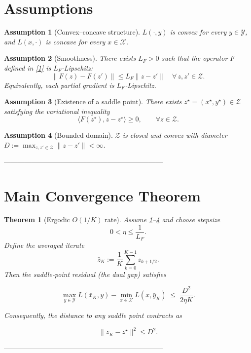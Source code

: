 \documentclass{article}
\newtheorem{theorem}{Theorem}
\newtheorem{assumption}{Assumption}
\begin{document}
\section*{Assumptions}
\begin{assumption}[Convex–concave structure]\label{ass:cc}
$L(\cdot,y)$ is convex for every $y\in\mathcal Y$, and $L(x,\cdot)$ is concave for every $x\in\mathcal X$.
\end{assumption}
\begin{assumption}[Smoothness]\label{ass:smooth}
There exists $L_F>0$ such that the operator $F$ defined in \eqref{1} is $L_F$‑Lipschitz:
\[
\|F(z)-F(z')\|\le L_F\|z-z'\|\quad\forall\,z,z'\in\mathcal Z .
\]
Equivalently, each partial gradient is $L_F$‑Lipschitz.
\end{assumption}
\begin{assumption}[Existence of a saddle point]\label{ass:saddle}
There exists $z^\star=(x^\star,y^\star)\in\mathcal Z$ satisfying the variational inequality
\[
\langle F(z^\star),z-z^\star\rangle\ge0,\qquad\forall z\in\mathcal Z .
\]
\end{assumption}
\begin{assumption}[Bounded domain]\label{ass:bounded}
$\mathcal Z$ is closed and convex with diameter $D:=\max_{z,z'\in\mathcal Z}\|z-z'\|<\infty$.
\end{assumption}

---------------------------------------------------------------------

\section*{Main Convergence Theorem}
\begin{theorem}[Ergodic $O(1/K)$ rate]\label{thm:ergodic}
Assume \ref{ass:cc}–\ref{ass:bounded} and choose stepsize  
\[
0<\eta\le\frac{1}{L_F}.
\]
Define the averaged iterate  
\[
\bar z_K:=\frac{1}{K}\sum_{k=0}^{K-1}z_{k+1/2}.
\]
Then the saddle‑point residual (the \emph{dual gap}) satisfies  

\[
\max_{y\in\mathcal Y}L(\bar x_K,y)-\min_{x\in\mathcal X}L(x,\bar y_K)
\;\le\;
\frac{D^{2}}{2\eta K}.
\tag{4}
\]

Consequently, the distance to any saddle point contracts as  

\[
\|z_{K}-z^\star\|^{2}\le D^{2} .
\]

\end{theorem}

---------------------------------------------------------------------
\end{document}
